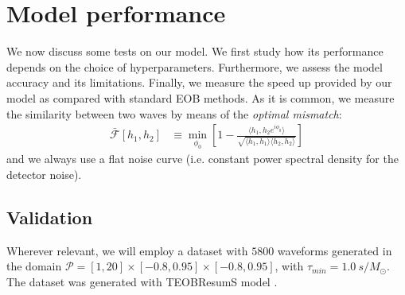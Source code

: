 \section{Model performance}
We now discuss some tests on our model. We first study how its performance depends on the choice of hyperparameters. Furthermore, we assess the model accuracy and its limitations.
Finally, we measure the speed up provided by our model as compared with standard EOB methods.
As it is common, we measure the similarity between two waves by means of the \textit{optimal mismatch}:
\begin{align}
	\bar{\mathcal{F}}[h_1,h_2] &\equiv \min_{\phi_0} \left[ 1- \frac{\langle h_1, h_2 e^{i\phi_0} \rangle}{\sqrt{\langle h_1, h_1 \rangle \langle h_2, h_2 \rangle}} \right]	\label{eq:mismatch_def}
\end{align}
and we always use a flat noise curve (i.e. constant power spectral density for the detector noise).
\subsection{Validation}
Wherever relevant, we will employ a dataset with $5800$ waveforms generated in the domain $\mathcal{P} = [1,20]\times[-0.8,0.95]\times[-0.8,0.95]$, with $\tau_{min} = \SI{1.0}{s/M_\odot}$. The dataset was generated with TEOBResumS model \cite{}.
